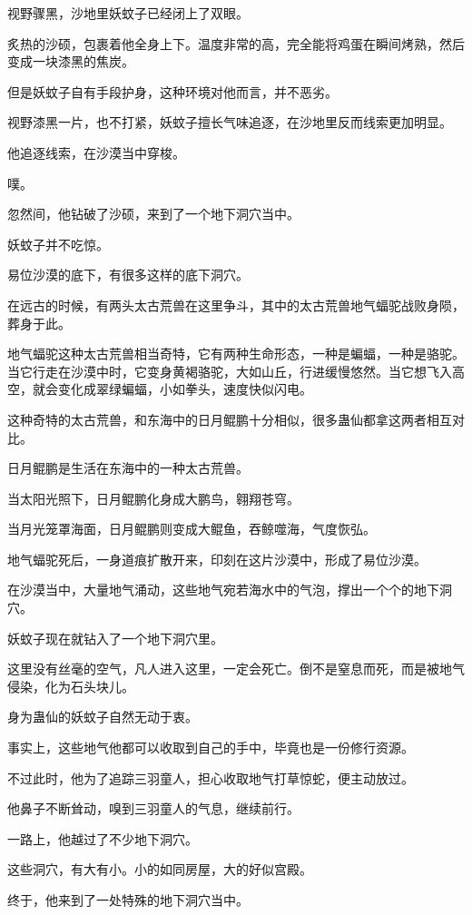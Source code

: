 \begin{this_body}
视野骤黑，沙地里妖蚊子已经闭上了双眼。

炙热的沙硕，包裹着他全身上下。温度非常的高，完全能将鸡蛋在瞬间烤熟，然后变成一块漆黑的焦炭。

但是妖蚊子自有手段护身，这种环境对他而言，并不恶劣。

视野漆黑一片，也不打紧，妖蚊子擅长气味追逐，在沙地里反而线索更加明显。

他追逐线索，在沙漠当中穿梭。

噗。

忽然间，他钻破了沙硕，来到了一个地下洞穴当中。

妖蚊子并不吃惊。

易位沙漠的底下，有很多这样的底下洞穴。

在远古的时候，有两头太古荒兽在这里争斗，其中的太古荒兽地气蝠驼战败身陨，葬身于此。

地气蝠驼这种太古荒兽相当奇特，它有两种生命形态，一种是蝙蝠，一种是骆驼。当它行走在沙漠中时，它变身黄褐骆驼，大如山丘，行进缓慢悠然。当它想飞入高空，就会变化成翠绿蝙蝠，小如拳头，速度快似闪电。

这种奇特的太古荒兽，和东海中的日月鲲鹏十分相似，很多蛊仙都拿这两者相互对比。

日月鲲鹏是生活在东海中的一种太古荒兽。

当太阳光照下，日月鲲鹏化身成大鹏鸟，翱翔苍穹。

当月光笼罩海面，日月鲲鹏则变成大鲲鱼，吞鲸噬海，气度恢弘。

地气蝠驼死后，一身道痕扩散开来，印刻在这片沙漠中，形成了易位沙漠。

在沙漠当中，大量地气涌动，这些地气宛若海水中的气泡，撑出一个个的地下洞穴。

妖蚊子现在就钻入了一个地下洞穴里。

这里没有丝毫的空气，凡人进入这里，一定会死亡。倒不是窒息而死，而是被地气侵染，化为石头块儿。

身为蛊仙的妖蚊子自然无动于衷。

事实上，这些地气他都可以收取到自己的手中，毕竟也是一份修行资源。

不过此时，他为了追踪三羽童人，担心收取地气打草惊蛇，便主动放过。

他鼻子不断耸动，嗅到三羽童人的气息，继续前行。

一路上，他越过了不少地下洞穴。

这些洞穴，有大有小。小的如同房屋，大的好似宫殿。

终于，他来到了一处特殊的地下洞穴当中。


\end{this_body}

